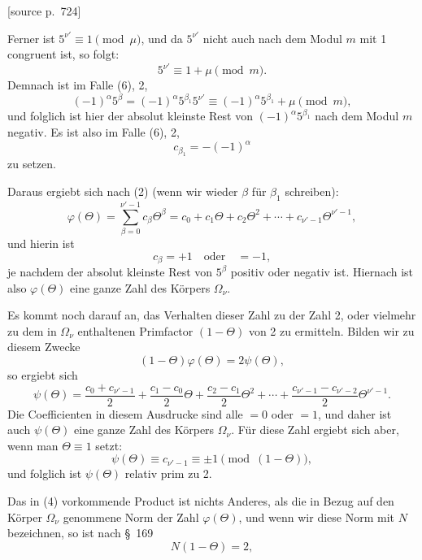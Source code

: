 \documentclass[11pt]{article}
\newcommand{\srcpage}[1]{\par\medskip\noindent\textsf{[source p.~#1]}\par\smallskip}
\begin{document}
\srcpage{724}
Ferner ist $5^{\nu'}\equiv1\pmod\mu$, und da $5^{\nu'}$ nicht auch nach dem Modul $m$ mit 1 congruent ist, so folgt:
\begin{equation}
5^{\nu'}\equiv1+\mu\pmod m.
\tag{7}
\end{equation}
Demnach ist im Falle (6), 2,
\[
(-1)^\alpha5^\beta=(-1)^\alpha5^{\beta_1}5^{\nu'}\equiv(-1)^\alpha5^{\beta_1}+\mu\pmod m,
\]
und folglich ist hier der absolut kleinste Rest von $(-1)^\alpha5^{\beta_1}$ nach dem Modul $m$ negativ. Es ist also im Falle (6), 2,
\[
c_{\beta_1}=-(-1)^\alpha
\]
zu setzen.

Daraus ergiebt sich nach (2) (wenn wir wieder $\beta$ für $\beta_1$ schreiben):
\begin{equation}
\varphi(\Theta)=\sum_{\beta=0}^{\nu'-1}c_\beta\Theta^\beta
=c_0+c_1\Theta+c_2\Theta^2+\cdots+c_{\nu'-1}\Theta^{\nu'-1},
\tag{8}
\end{equation}
und hierin ist
\begin{equation}
c_\beta=+1\quad\text{oder}\quad=-1,
\tag{9}
\end{equation}
je nachdem der absolut kleinste Rest von $5^\beta$ positiv oder negativ ist. Hiernach ist also $\varphi(\Theta)$ eine ganze Zahl des Körpers $\Omega_\nu$.

Es kommt noch darauf an, das Verhalten dieser Zahl zu der Zahl 2, oder vielmehr zu dem in $\Omega_\nu$ enthaltenen Primfactor $(1-\Theta)$ von 2 zu ermitteln. Bilden wir zu diesem Zwecke
\begin{equation}
(1-\Theta)\varphi(\Theta)=2\psi(\Theta),
\tag{10}
\end{equation}
so ergiebt sich
\begin{equation}
\psi(\Theta)=\frac{c_0+c_{\nu'-1}}2+\frac{c_1-c_0}2\Theta+\frac{c_2-c_1}2\Theta^2+\cdots+
\frac{c_{\nu'-1}-c_{\nu'-2}}2\Theta^{\nu'-1}.
\tag{11}
\end{equation}
Die Coefficienten in diesem Ausdrucke sind alle $=0$ oder $=1$, und daher ist auch $\psi(\Theta)$ eine ganze Zahl des Körpers $\Omega_\nu$. Für diese Zahl ergiebt sich aber, wenn man $\Theta\equiv1$ setzt:
\begin{equation}
\psi(\Theta)\equiv c_{\nu'-1}\equiv\pm1\pmod{(1-\Theta)},
\tag{12}
\end{equation}
und folglich ist $\psi(\Theta)$ relativ prim zu 2.

Das in (4) vorkommende Product ist nichts Anderes, als die in Bezug auf den Körper $\Omega_\nu$ genommene Norm der Zahl $\varphi(\Theta)$, und wenn wir diese Norm mit $N$ bezeichnen, so ist nach \S~169
\[
N(1-\Theta)=2,
\]
\end{document}
